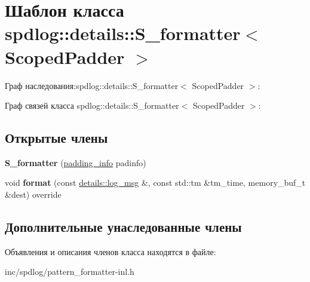 \hypertarget{classspdlog_1_1details_1_1S__formatter}{}\section{Шаблон класса spdlog\+:\+:details\+:\+:S\+\_\+formatter$<$ Scoped\+Padder $>$}
\label{classspdlog_1_1details_1_1S__formatter}


Граф наследования\+:spdlog\+:\+:details\+:\+:S\+\_\+formatter$<$ Scoped\+Padder $>$\+:


Граф связей класса spdlog\+:\+:details\+:\+:S\+\_\+formatter$<$ Scoped\+Padder $>$\+:
\subsection*{Открытые члены}
\begin{DoxyCompactItemize}
\item 
\mbox{\label{classspdlog_1_1details_1_1S__formatter_a99092cf2a5feba75422e10822005751e}} 
{\bfseries S\+\_\+formatter} (\hyperlink{structspdlog_1_1details_1_1padding__info}{padding\+\_\+info} padinfo)
\item 
\mbox{\label{classspdlog_1_1details_1_1S__formatter_ad3f7bc8f62aba78f7fb5d8531e7632b6}} 
void {\bfseries format} (const \hyperlink{structspdlog_1_1details_1_1log__msg}{details\+::log\+\_\+msg} \&, const std\+::tm \&tm\+\_\+time, memory\+\_\+buf\+\_\+t \&dest) override
\end{DoxyCompactItemize}
\subsection*{Дополнительные унаследованные члены}


Объявления и описания членов класса находятся в файле\+:\begin{DoxyCompactItemize}
\item 
inc/spdlog/pattern\+\_\+formatter-\/inl.\+h\end{DoxyCompactItemize}
